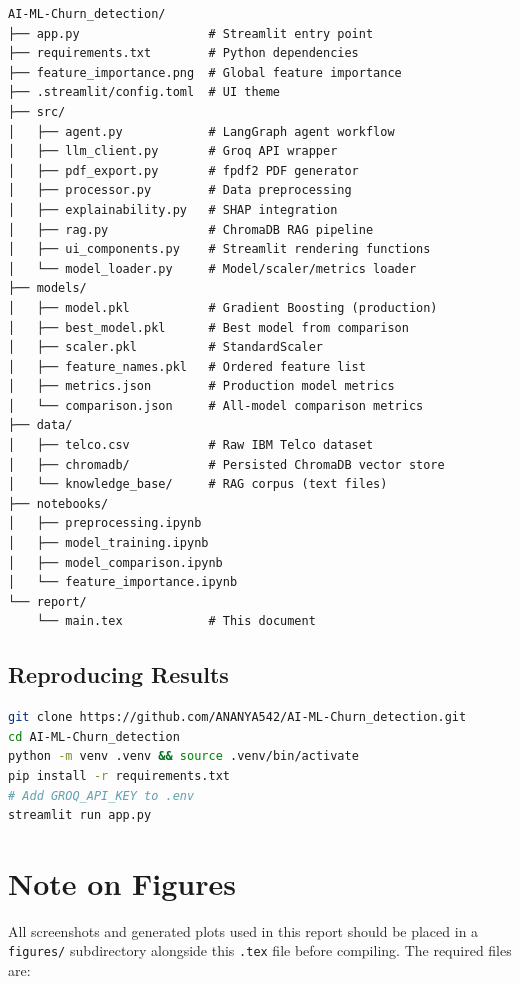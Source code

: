 \documentclass[conference]{IEEEtran}
\begin{document}
\begin{verbatim}
AI-ML-Churn_detection/
├── app.py                  # Streamlit entry point
├── requirements.txt        # Python dependencies
├── feature_importance.png  # Global feature importance
├── .streamlit/config.toml  # UI theme
├── src/
│   ├── agent.py            # LangGraph agent workflow
│   ├── llm_client.py       # Groq API wrapper
│   ├── pdf_export.py       # fpdf2 PDF generator
│   ├── processor.py        # Data preprocessing
│   ├── explainability.py   # SHAP integration
│   ├── rag.py              # ChromaDB RAG pipeline
│   ├── ui_components.py    # Streamlit rendering functions
│   └── model_loader.py     # Model/scaler/metrics loader
├── models/
│   ├── model.pkl           # Gradient Boosting (production)
│   ├── best_model.pkl      # Best model from comparison
│   ├── scaler.pkl          # StandardScaler
│   ├── feature_names.pkl   # Ordered feature list
│   ├── metrics.json        # Production model metrics
│   └── comparison.json     # All-model comparison metrics
├── data/
│   ├── telco.csv           # Raw IBM Telco dataset
│   ├── chromadb/           # Persisted ChromaDB vector store
│   └── knowledge_base/     # RAG corpus (text files)
├── notebooks/
│   ├── preprocessing.ipynb
│   ├── model_training.ipynb
│   ├── model_comparison.ipynb
│   └── feature_importance.ipynb
└── report/
    └── main.tex            # This document
\end{verbatim}

\subsection{Reproducing Results}

\begin{lstlisting}[language=bash, caption={Setup and run instructions}]
git clone https://github.com/ANANYA542/AI-ML-Churn_detection.git
cd AI-ML-Churn_detection
python -m venv .venv && source .venv/bin/activate
pip install -r requirements.txt
# Add GROQ_API_KEY to .env
streamlit run app.py
\end{lstlisting}

\section{Note on Figures}

All screenshots and generated plots used in this report should be
placed in a \texttt{figures/} subdirectory alongside this \texttt{.tex}
file before compiling. The required files are:
\end{document}
